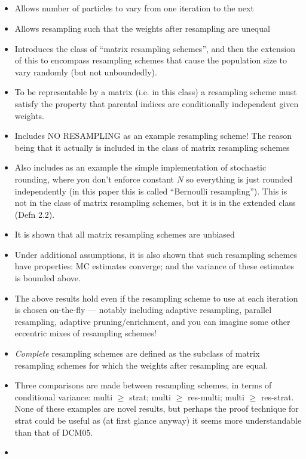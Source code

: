 \documentclass{article}
\begin{document}
\subsection*{\cite{webber2019}}
\begin{itemize}
\item Allows number of particles to vary from one iteration to the next
\item Allows resampling such that the weights after resampling are unequal
\item Introduces the class of ``matrix resampling schemes'', and then the extension of this to encompass resampling schemes that cause the population size to vary randomly (but not unboundedly). 
\item To be representable by a matrix (i.e. in this class) a resampling scheme must satisfy the property that parental indices are conditionally independent given weights.
\item Includes NO RESAMPLING as an example resampling scheme! The reason being that it actually is included in the class of matrix resampling schemes
\item Also includes as an example the simple implementation of stochastic rounding, where you don't enforce constant $N$ so everything is just rounded independently (in this paper this is called ``Bernoulli resampling''). This is not in the class of matrix resampling schemes, but it is in the extended class (Defn 2.2).
\item It is shown that all matrix resampling schemes are unbiased
\item Under additional assumptions, it is also shown that such resampling schemes have properties: MC estimates converge; and the variance of these estimates is bounded above.
\item The above results hold even if the resampling scheme to use at each iteration is chosen on-the-fly --- notably including adaptive resampling, parallel resampling, adaptive pruning/enrichment, and you can imagine some other eccentric mixes of resampling schemes!
\item \emph{Complete} resampling schemes are defined as the subclass of matrix resampling schemes for which the weights after resampling are equal.
\item Three comparisons are made between resampling schemes, in terms of conditional variance: multi $\geq$ strat; multi $\geq$ res-multi; multi $\geq$ res-strat. None of these examples are novel results, but perhaps the proof technique for strat could be useful as (at first glance anyway) it seems more understandable than that of DCM05.
\item
\end{itemize}
\end{document}
